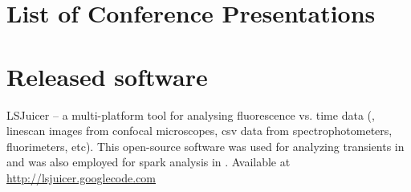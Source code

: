     
    \vspace*{3ex}


    \chapter*{List of Conference Presentations}
    
    

    \chapter*{Released software}
    \textsf{LSJuicer} -- a multi-platform tool for analysing fluorescence vs.
    time data (\eg, linescan images from confocal microscopes, csv data
    from spectrophotometers, fluorimeters, etc). This open-source software was used
    for analyzing  transients in \PaperII and was also employed for  spark analysis in
    \cite{Ramay_11_CardiovascRes_91_p598}. Available at
  \url{http://lsjuicer.googlecode.com}

    \newpage




    
